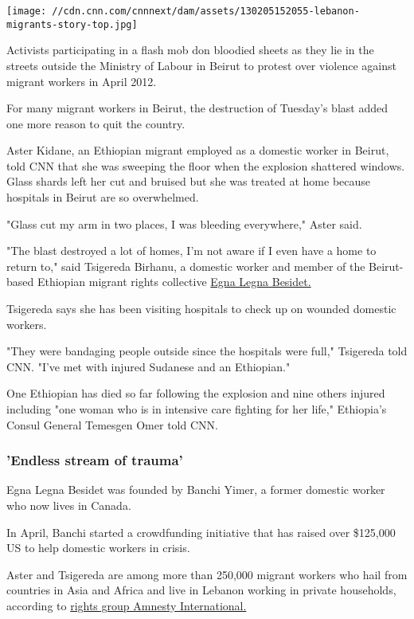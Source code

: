 \texttt{[image: //cdn.cnn.com/cnnnext/dam/assets/130205152055-lebanon-migrants-story-top.jpg]}

Activists participating in a flash mob don bloodied sheets as they lie
in the streets outside the Ministry of Labour in Beirut to protest over
violence against migrant workers in April 2012.

For many migrant workers in Beirut, the destruction of Tuesday's blast
added one more reason to quit the country.

Aster Kidane, an Ethiopian migrant employed as a domestic worker in
Beirut, told CNN that she was sweeping the floor when the explosion
shattered windows. Glass shards left her cut and bruised but she was
treated at home because hospitals in Beirut are so overwhelmed.

"Glass cut my arm in two places, I was bleeding everywhere," Aster said.

"The blast destroyed a lot of homes, I'm not aware if I even have a home
to return to," said Tsigereda Birhanu, a domestic worker and member of
the Beirut-based Ethiopian migrant rights collective
\href{https://egnalegna.org/\#about-us}{Egna Legna Besidet.}

Tsigereda says she has been visiting hospitals to check up on wounded
domestic workers.

"They were bandaging people outside since the hospitals were full,"
Tsigereda told CNN. "I've met with injured Sudanese and an Ethiopian."

One Ethiopian has died so far following the explosion and nine others
injured including "one woman who is in intensive care fighting for her
life," Ethiopia's Consul General Temesgen Omer told CNN.

\hypertarget{endless-stream-of-trauma}{%
\subsubsection{'Endless stream of
trauma'}\label{endless-stream-of-trauma}}

Egna Legna Besidet was founded by Banchi Yimer, a former domestic worker
who now lives in Canada.

In April, Banchi started a crowdfunding initiative that has raised over
\$125,000 US to help domestic workers in crisis.

Aster and Tsigereda are among more than 250,000 migrant workers who hail
from countries in Asia and Africa and live in Lebanon working in private
households, according to
\href{https://www.amnesty.org/en/latest/news/2020/06/lebanon-abandoned-migrant-domestic-workers-must-be-protected/}{rights
group Amnesty International.}

